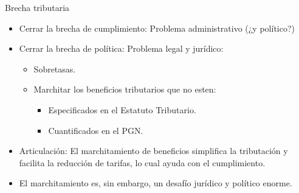 \begin{frame}{Brecha tributaria}
    \begin{itemize}
        \item Cerrar la brecha de cumplimiento: Problema administrativo (¿y político?)
        \item  Cerrar la brecha de política: Problema legal y jurídico:
        \begin{itemize}
            \item Sobretasas.
            \item Marchitar los beneficios tributarios que no esten: 
            \begin{itemize}
                \item Especificados en el Estatuto Tributario.
                \item Cuantificados en el PGN.
            \end{itemize}
        \end{itemize}
        \item Articulación: El marchitamiento de beneficios simplifica la tributación y facilita la reducción de tarifas, lo cual ayuda con el cumplimiento.
        \item El marchitamiento es, sin embargo, un desafío jurídico y político enorme.
    \end{itemize}
\end{frame}
